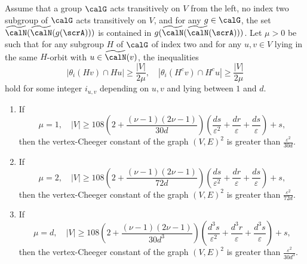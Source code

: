 \begin{theorem}\label{Thm:AlmostGraphAut}
Assume that a group $\calG$ acts transitively on $V$ from the left, no index two subgroup of $\calG$ acts transitively on $V$, and for any $g\in \calG$, the set 
$
\widetilde \calN (\widetilde \calN(g(\scrA)))$ 
is contained in 
$g(\widetilde \calN(\widetilde \calN(\scrA)))
$. Let $\mu> 0$ be such that for any subgroup $H$ of $\calG$ of index two and for any $u, v\in V$ lying in the same $H$-orbit with $u\in \widetilde \calN(v)$, the inequalities 
\begin{equation}
\label{Eqn:muBdd}
|\theta_i(Hv)\cap Hu|
\geq \frac{|V|}{2\mu},
\quad
|\theta_i(H^c v)\cap H^c u|
\geq \frac{|V|}{2\mu}
\end{equation}
hold for some integer $i_{u,v}$ depending on $u, v$ and lying between $1$ and $d$. 
\begin{enumerate}
\item 
If 
\begin{equation}
\label{Eqn:V108bdd20}
\mu = 1, \quad 
|V| 
 \geq 
108
\left( 2 + \frac {(\nu-1)(2\nu -1)} {30d}  \right)  
\left( \frac{ds}{\varepsilon^2} + \frac{dr}\varepsilon +\frac{ds}{\varepsilon}\right) + s ,
\end{equation}
then the vertex-Cheeger constant of the graph $(V, E)^2$ is greater than $\frac{\varepsilon^{2}}{30d}$. 
\item 
If 
\begin{equation}
\label{Eqn:V108bdd}
\mu = 2, \quad 
|V| 
 \geq 
108
\left( 2 + \frac {(\nu-1)(2\nu -1)}  {72d} \right)  
\left( \frac{ds}{\varepsilon^2} + \frac{dr}\varepsilon +\frac{ds}{\varepsilon}\right) + s ,
\end{equation}
then the vertex-Cheeger constant of the graph $(V, E)^2$ is greater than $\frac{\varepsilon^{2}}{72d}$. 
\item 
If
\begin{equation}
\label{Eqn:V108bdd20d3}
\mu = d, \quad 
|V| 
 \geq 
108
\left( 2 + \frac {(\nu-1)(2\nu -1)}  {30d^3} \right)  
\left( \frac{d^3s}{\varepsilon^2} + \frac{d^3r}\varepsilon+ \frac{d^{3}s}{\varepsilon}\right) + s,
\end{equation}
then the vertex-Cheeger constant of the graph $(V, E)^2$ is greater than $ \frac{\varepsilon^{2}}{30d^3}$. 
\end{enumerate}
\end{theorem}

